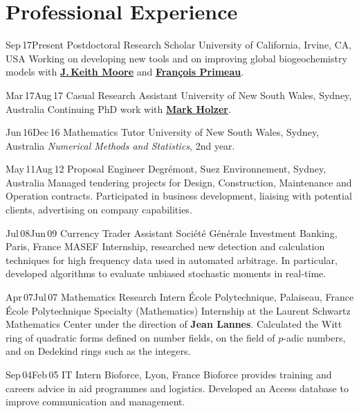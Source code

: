 \documentclass[12pt]{friggeri-cv}
\begin{document}
\section{Professional {\color{pblue}Exp}erience}
\begin{entrylist}
  \entry
    {Sep$\,$17\textemdash{}Present}
    {Postdoctoral Research Scholar}
    {University of California, Irvine, CA, USA}
    {Working on developing new tools and on improving global biogeochemistry models with \hyperref[JKM]{\textbf{J.\,Keith Moore}} and \hyperref[FP]{\textbf{Fran\c{c}ois Primeau}}.}

  \entry
    {Mar$\,$17\textemdash{}Aug$\,$17}
    {Casual Research Assistant}
    {University of New South Wales, Sydney, Australia}
    {Continuing PhD work with \hyperref[MH]{\textbf{Mark Holzer}}.
    }

  \entry
    {Jun$\,$16\textemdash{}Dec$\,$16}
    {Mathematics Tutor}
    {University of New South Wales, Sydney, Australia}
    {\emph{Numerical Methods and Statistics}, 2nd year.
    }

  \entry
    {May$\,$11\textemdash{}Aug$\,$12}
    {Proposal Engineer}
    {Degr\'{e}mont, Suez Environnement, Sydney, Australia}
    {Managed tendering projects for Design, Construction, Maintenance and Operation contracts.
    Participated in business development, liaising with potential clients, advertising on company capabilities.
    }

  \entry
    {Jul$\,$08\textemdash{}Jun$\,$09}
    {Currency Trader Assistant}
    {Soci\'{e}t\'{e} G\'{e}n\'{e}rale Investment Banking, Paris, France}
    {MASEF Internship, researched new detection and calculation techniques for high frequency data used in automated arbitrage.
    In particular, developed algorithms to evaluate unbiased stochastic moments in real-time.
    }

  \entry
    {Apr$\,$07\textemdash{}Jul$\,$07}
    {Mathematics Research Intern}
    {\'{E}cole Polytechnique, Palaiseau, France}
    {\'{E}cole Polytechnique Specialty (Mathematics) Internship at the Laurent Schwartz Mathematics Center under the direction of \textbf{Jean Lannes}. Calculated the Witt ring of quadratic forms defined on number fields, on the field of $p$-adic numbers, and on Dedekind rings such as the integers.
    }

  \entry
  {Sep$\,$04\textemdash{}Feb$\,$05}
    {IT Intern}
    {Bioforce, Lyon, France}
    {Bioforce provides training and careers advice in aid programmes and logistics. Developed an Access database to improve communication and management.
    }
\end{entrylist}
\end{document}
